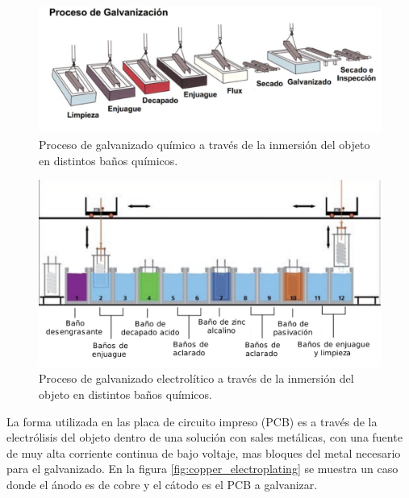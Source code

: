 \hspace{1px}
\begin{figure}[h]
	\centering
	\includegraphics[width=1.0\textwidth]{Figures/Cap_2/diagrama_galvanizado_basico}
	\caption{Proceso de galvanizado químico a través de la inmersión del objeto en distintos baños químicos.}
	\label{fig:galvanizado_quimico}
\end{figure}
\hspace{1px}
\begin{figure}[h]
	\centering
	\includegraphics[width=1.0\textwidth]{Figures/Cap_2/diagrama_galvanizado_electrolitico}
	\caption{Proceso de galvanizado electrolítico a través de la inmersión del objeto en distintos baños químicos.}
	\label{fig:galvanizado_electrolitico}
\end{figure}

La forma utilizada en las placa de circuito impreso (PCB) es a través de la electrólisis del objeto dentro de una solución con sales metálicas, con una fuente de muy alta corriente continua de bajo voltaje, mas bloques del metal necesario para el galvanizado. En la figura \ref{fig:copper_electroplating} se muestra un caso donde el ánodo es de cobre y el cátodo es el PCB a galvanizar. 

